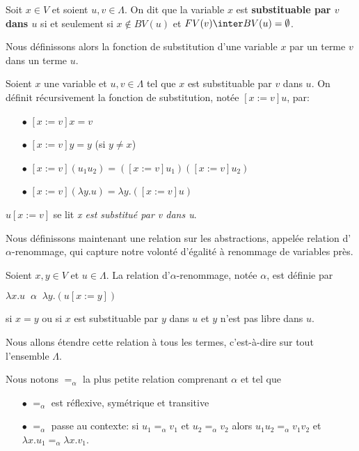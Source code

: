 \begin{definition} 
  Soit $x \in V$ et soient $u, v \in \Lambda$. On dit que la variable $x$ est
  \textbf{substituable par $v$ dans $u$} si et seulement si $x \notin BV(u)$ et
  $FV(v) \inter BV(u) = \emptyset$.
\end{definition}

Nous définissons alors la fonction de substitution d'une variable $x$ par un
terme $v$ dans un terme $u$.

\begin{definition} 
  Soient $x$ une variable et $u, v \in \Lambda$ tel que $x$ est substituable par
  $v$ dans $u$. On définit récursivement la fonction de substitution, notée $[x := v]u$, par:
  \begin{itemize}
  \item[$\bullet$] $[x := v]x = v$
  \item[$\bullet$] $[x := v]y = y$ (si $y \neq x$)
  \item[$\bullet$] $[x := v](u_{1} u_{2}) = ([x := v]u_{1})([x := v]u_{2})$
  \item[$\bullet$] $[x := v](\lambda y . u) = \lambda y . ([x := v]u)$
  \end{itemize}
  $u[x := v]$ se lit \textit{x est substitué par v dans u}.
\end{definition}

Nous définissons maintenant une relation sur les abstractions, appelée relation d'
\textbf{$\alpha$}-renommage, qui capture
notre volonté d'égalité à renommage de variables près.

\begin{definition} 
  Soient $x, y \in V$ et $u \in \Lambda$.
  La relation d'$\alpha$-renommage, notée $\alpha$, est définie par

  \begin{math}
    \lambda x . u \;\; \alpha \;\; \lambda y . (u[x := y])
  \end{math}

  si $x = y$ ou si $x$ est substituable par $y$ dans $u$ et $y$ n'est pas libre
  dans $u$.
\end{definition}

Nous allons étendre cette relation à tous les termes, c'est-à-dire sur tout l'ensemble $\Lambda$.

Nous notons $=_{\alpha}$ la plus petite relation comprenant $\alpha$ et tel que
\begin{itemize}
  \item[$\bullet$] $=_{\alpha}$ est réflexive, symétrique et transitive
  \item[$\bullet$] $=_{\alpha}$ passe au contexte: si $u_{1} =_{\alpha} v_{1}$
    et $u_{2} =_{\alpha} v_{2}$ alors $u_{1}u_{2} =_{\alpha} v_{1}v_{2}$ et
    $\lambda x . u_{1} =_{\alpha} \lambda x . v_{1}$.
\end{itemize}

